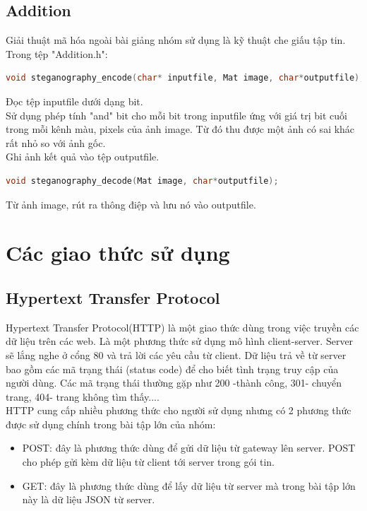 \documentclass[a4paper]{article}
\begin{document}
	\subsection{Addition}
	Giải thuật mã hóa ngoài bài giảng nhóm sử dụng là kỹ thuật che giấu tập tin. Trong tệp "Addition.h":\\
	\begin{lstlisting}[language=C]
void steganography_encode(char* inputfile, Mat image, char*outputfile);
	\end{lstlisting}
	Đọc tệp inputfile dưới dạng bit.\\
	Sử dụng phép tính "and" bit cho mỗi bit trong inputfile ứng với giá trị bit cuối trong mỗi kênh màu, pixels của ảnh image. Từ đó thu được một ảnh có sai khác rất nhỏ so với ảnh gốc.\\
	Ghi ảnh kết quả vào tệp outputfile.\\

	\begin{lstlisting}[language=C]
void steganography_decode(Mat image, char*outputfile);
	\end{lstlisting}
	Từ ảnh image, rút ra thông điệp và lưu nó vào outputfile.

\section{Các giao thức sử dụng}
	\subsection{Hypertext Transfer Protocol}
    Hypertext Transfer Protocol(HTTP)\cite{HTTP} là một giao thức dùng trong việc truyền các dữ liệu trên các web. Là một phương thức sử dụng mô hình client-server. Server sẽ lắng nghe ở cổng 80 và trả lời các yêu cầu từ client. Dữ liệu trả về từ server bao gồm các mã trạng thái (status code) để  cho biết tình trạng truy cập của người dùng. Các mã trạng thái thường gặp như 200 -thành công, 301- chuyển trang, 404- trang không tìm thấy....\\
    
    HTTP cung cấp nhiều phương thức cho người sử dụng nhưng có 2 phương thức được sử dụng chính trong bài tập lớn của nhóm:
    \begin{itemize}
        \item POST: đây là phương thức dùng để  gửi dữ liệu từ gateway lên server. POST cho phép gửi kèm dữ liệu từ client tới server trong gói tin.
        \item GET: đây là phương thức dùng để lấy dữ liệu từ server mà trong bài tập lớn này là dữ liệu JSON từ server.
    \end{itemize}
	
\end{document}
